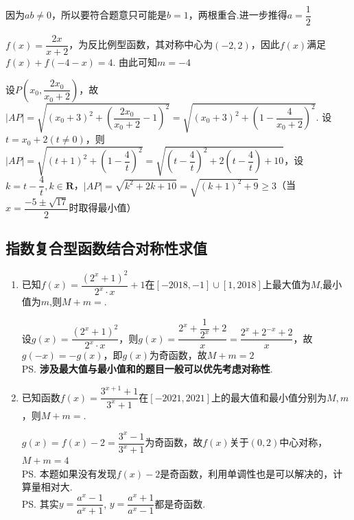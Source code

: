 \begin{enumerate}
\begin{jieda}
\begin{enumerate*}
            因为$ab \neq 0$，所以要符合题意只可能是$b = 1$，两根重合.进一步推得$a = \dfrac{1}{2}$ \\
            \item $f(x) = \dfrac{2x}{x+2}$，为反比例型函数，其对称中心为$(-2, 2)$，因此$f(x)$满足$f(x) + f(-4-x) = 4$. 由此可知$m = -4$ \\
            \item 设$P\left(x_0, \dfrac{2x_0}{x_0+2}\right)$，故$|AP| = \sqrt{(x_0+3)^2+(\dfrac{2x_0}{x_0+2}-1)^2}   = \sqrt{(x_0+3)^2+(1-\dfrac{4}{x_0+2})^2}$. 设$t = x_0+2 (t \neq 0)$，则$|AP| = \sqrt{(t+1)^2+(1-\dfrac{4}{t})^2} = \sqrt{(t-\dfrac{4}{t})^2+2(t-\dfrac{4}{t})+10}$，设$k = t - \dfrac{4}{t}, k \in \mathbf{R}$，$|AP| = \sqrt{k^2+2k+10} = \sqrt{(k+1)^2+9} \geq 3$（当$x = \dfrac{-5\pm\sqrt{17}}{2}$时取得最小值）
        \end{enumerate*}
    \end{jieda}
\end{enumerate}
\subsection*{指数复合型函数结合对称性求值}
\begin{enumerate}
    \item 已知$f(x) = \dfrac{(2^x+1)^2}{2^x \cdot x}+1$在$[-2018, -1]\cup[1, 2018]$上最大值为$M$,最小值为$m$,则$M+m = $.
    \begin{jieda}
    设$g(x) = \dfrac{(2^x+1)^2}{2^x \cdot x}$，则$g(x) = \dfrac{2^x+\dfrac{1}{2^x}+2}{x} = \dfrac{2^x+2^{-x}+2}{x}$，故$g(-x) = -g(x)$，即$g(x)$为奇函数，故$M+m = 2$ \\
    \ps \textbf{涉及最大值与最小值和的题目一般可以优先考虑对称性}.
    \end{jieda}
    \item 已知函数$f(x) = \dfrac{3^{x+1}+1}{3^x+1}$在$[-2021, 2021]$上的最大值和最小值分别为$M, m$，则$M+m = $.
    \begin{jieda}
        $g(x) = f(x) - 2 = \dfrac{3^x - 1}{3^x+1}$为奇函数，故$f(x)$关于$(0, 2)$中心对称，$M+m = 4$ \\
        \ps 本题如果没有发现$f(x) - 2$是奇函数，利用单调性也是可以解决的，计算量相对大. \\
        \ps 其实$y=\dfrac{a^x-1}{a^x+1}$, $y=\dfrac{a^x+1}{a^x-1}$都是奇函数.
    \end{jieda}
\end{enumerate}

